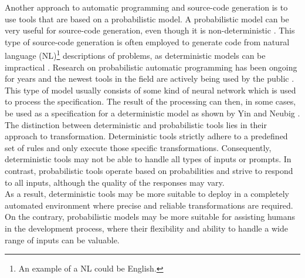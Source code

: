 Another approach to automatic programming and source-code generation is to use tools that are based on a probabilistic model.
A probabilistic model can be very useful for source-code generation, even though it is non-deterministic \cite{chenEvaluatingLargeLanguage2021}.
This type of source-code generation is often employed to generate code from natural language (NL)\footnote{
    An example of a NL could be English.
}
descriptions of problems, as deterministic models can be impractical \cite{alonStructuralLanguageModels2020}.
Research on probabilistic automatic programming has been ongoing for years and the newest tools in the field are actively being used by the public \cite{WhatChatGPTWhy, johnmaedaChoosingLLMModel2023}.
This type of model usually consists of some kind of neural network which is used to process the specification. 
The result of the processing can then, in some cases, be used as a specification for a deterministic model as shown by Yin and Neubig \cite{yinSyntacticNeuralModel2017}.\\
The distinction between deterministic and probabilistic tools lies in their approach to transformation. Deterministic tools strictly adhere to a predefined set of rules and only execute those specific transformations. Consequently, deterministic tools may not be able to handle all types of inputs or prompts.
In contrast, probabilistic tools operate based on probabilities and strive to respond to all inputs, although the quality of the responses may vary.\\
As a result, deterministic tools may be more suitable to deploy in a completely automated environment where precise and reliable transformations are required.
On the contrary, probabilistic models may be more suitable for assisting humans in the development process, where their flexibility and ability to handle a wide range of inputs can be valuable.